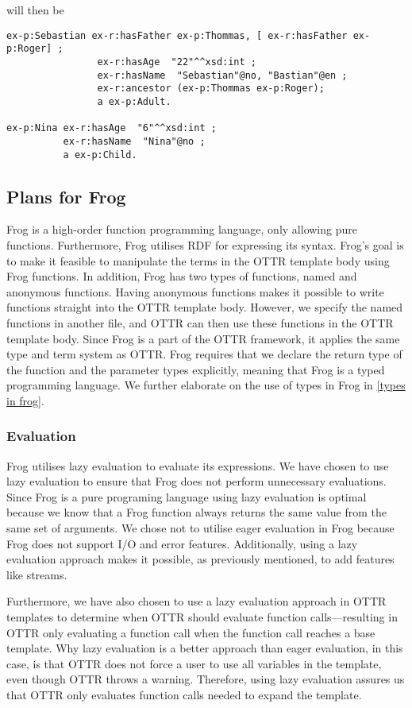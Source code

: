 will then be
\begin{lstlisting}[frame=single, language=turtle]
ex-p:Sebastian ex-r:hasFather ex-p:Thommas, [ ex-r:hasFather ex-p:Roger] ; 
                ex-r:hasAge  "22"^^xsd:int ; 
                ex-r:hasName  "Sebastian"@no, "Bastian"@en ;
                ex-r:ancestor (ex-p:Thommas ex-p:Roger);
                a ex-p:Adult.

ex-p:Nina ex-r:hasAge  "6"^^xsd:int ; 
          ex-r:hasName  "Nina"@no ;
          a ex-p:Child.
\end{lstlisting}

\subsection{Plans for Frog}
Frog is a high-order function programming language, only allowing pure functions. Furthermore, Frog utilises RDF for expressing its syntax. Frog's goal is to make it feasible to manipulate the terms in the OTTR template body using Frog functions. In addition, Frog has two types of functions, named and anonymous functions. Having anonymous functions makes it possible to write functions straight into the OTTR template body. However, we specify the named functions in another file, and OTTR can then use these functions in the OTTR template body. Since Frog is a part of the OTTR framework, it applies the same type and term system as OTTR. Frog requires that we declare the return type of the function and the parameter types explicitly, meaning that Frog is a typed programming language. We further elaborate on the use of types in Frog in \autoref{types in frog}.


\subsubsection{Evaluation}
Frog utilises lazy evaluation to evaluate its expressions. We have chosen to use lazy evaluation to ensure that Frog does not perform unnecessary evaluations. Since Frog is a pure programing language using lazy evaluation is optimal because we know that a Frog function always returns the same value from the same set of arguments. We chose not to utilise eager evaluation in Frog because Frog does not support I/O and error features. Additionally, using a lazy evaluation approach makes it possible, as previously mentioned, to add features like streams.

\para
Furthermore, we have also chosen to use a lazy evaluation approach in OTTR templates to determine when OTTR should evaluate function calls—resulting in OTTR only evaluating a function call when the function call reaches a base template. Why lazy evaluation is a better approach than eager evaluation, in this case, is that OTTR does not force a user to use all variables in the template, even though OTTR throws a warning. Therefore, using lazy evaluation assures us that OTTR only evaluates function calls needed to expand the template.  

